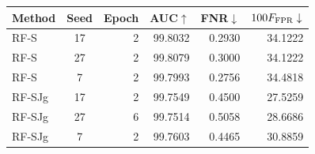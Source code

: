 \begin{tabular}{lcrrrr}
\toprule
Method & Seed & Epoch & AUC$\uparrow$ & FNR$\downarrow$ & $100F_{\rm FPR}\downarrow$ \\
\midrule
RF-S & 17 & 2 & 99.8032 & 0.2930 & 34.1222 \\
RF-S & 27 & 2 & 99.8079 & 0.3000 & 34.1222 \\
RF-S & 7 & 2 & 99.7993 & 0.2756 & 34.4818 \\
RF-SJg & 17 & 2 & 99.7549 & 0.4500 & 27.5259 \\
RF-SJg & 27 & 6 & 99.7514 & 0.5058 & 28.6686 \\
RF-SJg & 7 & 2 & 99.7603 & 0.4465 & 30.8859 \\
\bottomrule
\end{tabular}
